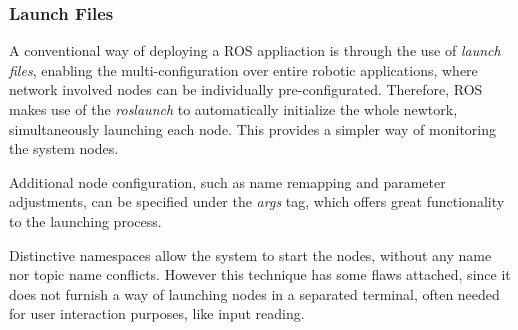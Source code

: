



\subsubsection{Launch Files}

A conventional way of deploying a ROS appliaction is through the use of \textit{launch files}, enabling the multi-configuration over entire robotic applications, where network involved nodes can be individually pre-configurated. Therefore, ROS makes use of the \textit{roslaunch} to automatically initialize the whole newtork, simultaneously launching each node. This provides a simpler way of monitoring the system nodes.

Additional node configuration, such as name remapping and parameter adjustments, can be specified under the \textit{args} tag, which offers great functionality to the launching process. 

Distinctive namespaces allow the system to start the nodes, without any name nor topic name conflicts. However this technique has some flaws attached, since it does not furnish a way of launching nodes in a separated terminal, often needed for user interaction purposes, like input reading.



